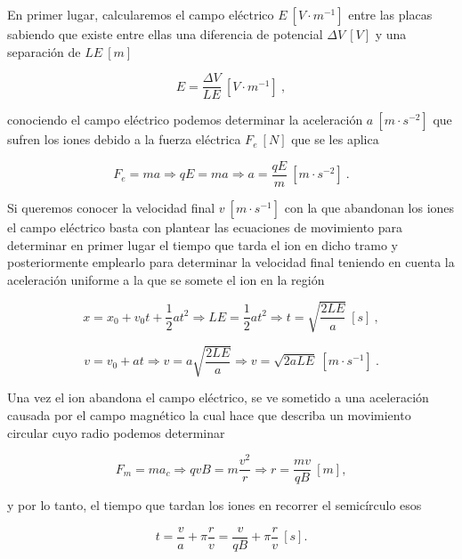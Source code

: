 \documentclass[journal]{IEEEtran}
\begin{document}
En primer lugar, calcularemos el campo eléctrico $E~[V\cdot m^{-1}]$ entre las placas sabiendo que existe entre ellas una diferencia de potencial $\Delta V~[V]$ y una separación de $LE~[m]$

\begin{equation}
E = \displaystyle\frac{\Delta V}{LE}~[V\cdot m^{-1}]~,
\end{equation}

conociendo el campo eléctrico podemos determinar la aceleración $a~[m\cdot s^{-2}]$ que sufren los iones debido a la fuerza eléctrica $F_e~[N]$ que se les aplica

\begin{equation}
F_e = ma \Rightarrow qE = ma \Rightarrow a = \displaystyle\frac{qE}{m}~[m\cdot s^{-2}]~.
\end{equation}

Si queremos conocer la velocidad final $v~[m\cdot s^{-1}]$ con la que abandonan los iones el campo eléctrico basta con plantear las ecuaciones de movimiento para determinar en primer lugar el tiempo que tarda el ion en dicho tramo y posteriormente emplearlo para determinar la velocidad final teniendo en cuenta la aceleración uniforme a la que se somete el ion en la región

\begin{equation}
x = x_0 + v_0t + \displaystyle\frac{1}{2}at^2 \Rightarrow LE = \displaystyle\frac{1}{2}at^2 \Rightarrow t = \sqrt{\displaystyle\frac{2LE}{a}}~[s]~,
\end{equation}

\begin{equation}
v = v_0 + at \Rightarrow v = a\sqrt{\displaystyle\frac{2LE}{a}} \Rightarrow v = \sqrt{2aLE}~[m\cdot s^{-1}]~.
\end{equation}

Una vez el ion abandona el campo eléctrico, se ve sometido a una aceleración causada por el campo magnético la cual hace que describa un movimiento circular cuyo radio podemos determinar

\begin{equation}
F_m = ma_c \Rightarrow qvB = m \displaystyle\frac{v^2}{r} \Rightarrow r = \displaystyle\frac{mv}{qB}~[m],
\end{equation}

y por lo tanto, el tiempo que tardan los iones en recorrer el semicírculo esos

\begin{equation}
t = \displaystyle\frac{v}{a} + \pi \displaystyle\frac{r}{v} = \displaystyle\frac{v}{qB} + \pi \displaystyle\frac{r}{v}~[s].
\end{equation}
\end{document}
